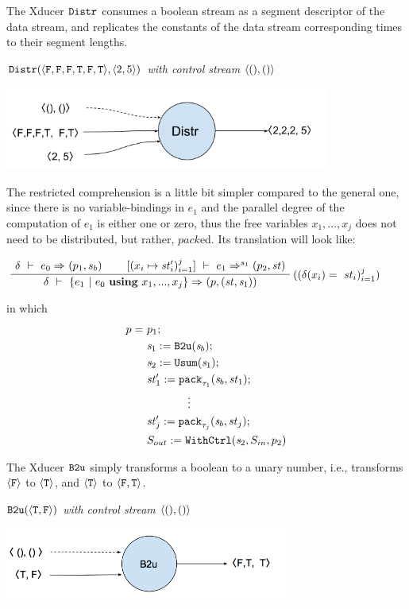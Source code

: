 The Xducer $\distr$ consumes a boolean stream as a segment descriptor of the data stream, and replicates the constants of the data stream corresponding times to their segment lengths.
\begin{example} \emph{$\distrf{\<\F,\F,\F,\T,\F,\T\'>}{\< 2,5 \'>}$ with control stream $\< (),() \'>$}\\
	\begin{center}
		\includegraphics[width=0.8\textwidth]{fig/distrxducer.png}
	\end{center}
\end{example}



The restricted comprehension is a little bit simpler compared to the general one, since there is no variable-bindings in $e_1$ and the parallel degree of the computation of $e_1$ is either one or zero, thus the free variables $x_1,...,x_j$ does not need to be distributed, but rather, $pack$ed. Its translation will look like:

$$\PT{
	\AC{\Trans{\del}{e_0}{}{}{(p_1,s_b)}}
	\AC{\Trans{[\j{x_i \|-> \st'_i}]}{e_1}{s_1}{}{\sfun{p_2}{\st}}}
	\RiLa{(\j{\del(x_i) = \ \st_i})}		
	\BC{\Trans{\del}{\RComp{e_1}{e_0}{\usevars}}{}{}
		{ \sfun{p} {(\st,\s_1)}}}
}$$


in which $$ \begin{aligned}
p = & \ p_1; \\
& \ \sdef{\s_1}{\bu(\s_b)}; \\
& \ \sdef{\s_2}{\usum(\s_1)}; \\
& \ \sdef{\st_1'}{\Pack{\s_b}{\st_1}{\tau_1}}; \\
& \qquad \qquad \vdots \\
& \ \sdef{\st_j'}{\Pack{\s_b}{\st_j}{\tau_j}}; \\
& \ \withctrl{\s_2}{p_2}{\Sin}{\Sout} \\
\end{aligned}$$
	
The Xducer $\bu$ simply transforms a boolean to a unary number, i.e.,  transforms $\oF$ to $\oT$, and $\oT$ to $\< \F, \T \'>$.
\begin{example} \emph{$\bu({\<\T,\F\'>})$ with control stream $\< (),() \'>$}\\
\begin{center}
	\includegraphics[width=0.7\textwidth]{b2uxudcer2}
\end{center}
\end{example}

